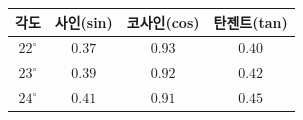 {\renewcommand{\arraystretch}{1.45}\small
\begin{tabular}{|c|c|c|c|}
\hline
각도 & 사인(sin) & 코사인(cos) & 탄젠트(tan) \\ \hline
$22^\circ$ & $0.37$ & $0.93$ & $0.40$ \\ \hline
$23^\circ$ & $0.39$ & $0.92$ & $0.42$ \\ \hline
$24^\circ$ & $0.41$ & $0.91$ & $0.45$ \\ \hline
\end{tabular}}
